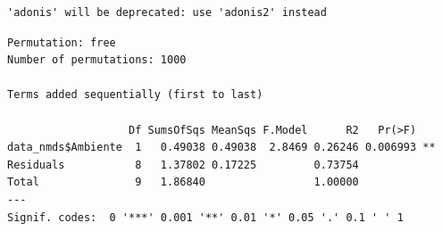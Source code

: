 \documentclass[
  letterpaper,
  DIV=11,
  numbers=noendperiod]{scrartcl}
\newenvironment{Shaded}{\begin{snugshade}}{\end{snugshade}}
\newcommand{\AttributeTok}[1]{\textcolor[rgb]{0.40,0.45,0.13}{#1}}
\newcommand{\DecValTok}[1]{\textcolor[rgb]{0.68,0.00,0.00}{#1}}
\newcommand{\FunctionTok}[1]{\textcolor[rgb]{0.28,0.35,0.67}{#1}}
\newcommand{\NormalTok}[1]{\textcolor[rgb]{0.00,0.23,0.31}{#1}}
\newcommand{\OtherTok}[1]{\textcolor[rgb]{0.00,0.23,0.31}{#1}}
\newcommand{\SpecialCharTok}[1]{\textcolor[rgb]{0.37,0.37,0.37}{#1}}
\begin{document}
\begin{Shaded}
\end{Shaded}

\begin{verbatim}
'adonis' will be deprecated: use 'adonis2' instead
\end{verbatim}

\begin{Shaded}
\end{Shaded}

\begin{verbatim}
Permutation: free
Number of permutations: 1000

Terms added sequentially (first to last)

                   Df SumsOfSqs MeanSqs F.Model      R2   Pr(>F)   
data_nmds$Ambiente  1   0.49038 0.49038  2.8469 0.26246 0.006993 **
Residuals           8   1.37802 0.17225         0.73754            
Total               9   1.86840                 1.00000            
---
Signif. codes:  0 '***' 0.001 '**' 0.01 '*' 0.05 '.' 0.1 ' ' 1
\end{verbatim}
\end{document}

